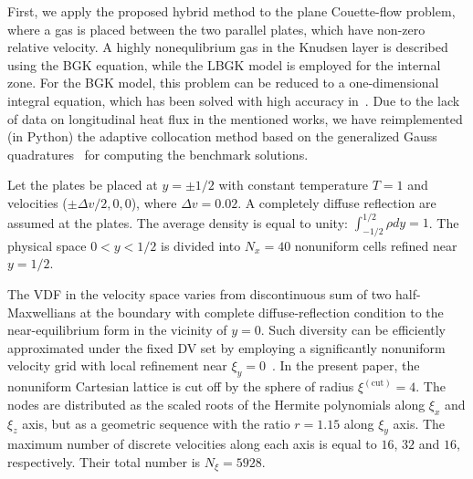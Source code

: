 \documentclass[]{elsarticle} %
\begin{document}
First, we apply the proposed hybrid method to the plane Couette-flow problem,
where a gas is placed between the two parallel plates, which have non-zero relative velocity.
A highly nonequlibrium gas in the Knudsen layer is described using the BGK equation, while the LBGK model is employed for the internal zone.
For the BGK model, this problem can be reduced to a one-dimensional integral equation,
which has been solved with high accuracy in~\cite{Luo2015, Luo2016}.
Due to the lack of data on longitudinal heat flux in the mentioned works, we have reimplemented (in Python)
the adaptive collocation method based on the generalized Gauss quadratures~\cite{Luo2016}
for computing the benchmark solutions.

Let the plates be placed at \(y = \pm 1/2\) with constant temperature \(T = 1\) and velocities (\(\pm\Delta v/2,0,0\)),
where \(\Delta v=0.02\). A completely diffuse reflection are assumed at the plates.
The average density is equal to unity: \(\int_{-1/2}^{1/2}\rho dy=1\).
The physical space \(0 < y < 1/2\) is divided into \(N_x = 40\) nonuniform cells refined near \(y = 1/2\).

The VDF in the velocity space varies from discontinuous sum of two half-Maxwellians at the boundary
with complete diffuse-reflection condition to the near-equilibrium form in the vicinity of \(y=0\).
Such diversity can be efficiently approximated under the fixed DV set by employing
a significantly nonuniform velocity grid with local refinement near \(\xi_y=0\)~\cite{Ohwada1990, Wu2014, Rogozin2016}.
In the present paper, the nonuniform Cartesian lattice is cut off by the sphere of radius \(\xi^{(\mathrm{cut})}=4\).
The nodes are distributed as the scaled roots of the Hermite polynomials along \(\xi_x\) and \(\xi_z\) axis,
but as a geometric sequence with the ratio \(r = 1.15\) along \(\xi_y\) axis.
The maximum number of discrete velocities along each axis is equal to \(16\), \(32\) and \(16\), respectively.
Their total number is \(N_\xi=5928\).
\end{document}
